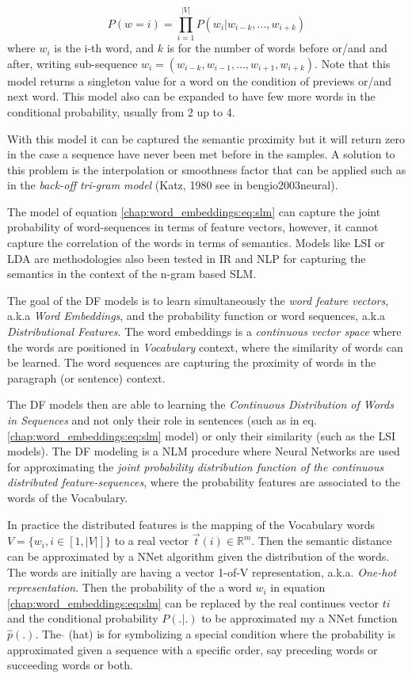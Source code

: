 \begin{equation} \label{chap:word_embeddings:eq:slm}
	P(w = i) = \prod_{i=1}^{|V|} P(w_{i}|w_{i-k}, ... , w_{i+k})
\end{equation}
\noindent
where $w_{i}$ is the i-th word, and $k$ is for the number of words before or/and and after, writing sub-sequence $w_{i} = (w_{i-k}, w_{i-1}, ... ,w_{i+1}, w_{i+k})$. Note that this model returns a singleton value for a word on the condition of previews or/and next word. This model also can be expanded to have few more words in the conditional probability, usually from 2 up to 4. 

With this model it can be captured the semantic proximity but it will return zero in the case a sequence have never been met before in the samples. A solution to this problem is the interpolation or smoothness factor that can be applied such as in the \textit{back-off tri-gram model} (Katz, 1980 see in bengio2003neural). 

The model of equation \ref{chap:word_embeddings:eq:slm} can capture the joint probability of word-sequences in terms of feature vectors, however, it cannot capture the correlation of the words in terms of semantics. Models like LSI or LDA are methodologies also been tested in IR and NLP for capturing the semantics in the context of the n-gram based SLM. 

The goal of the DF models is to learn simultaneously the \textit{word feature vectors}, a.k.a \textit{Word Embeddings}, and the probability function or word sequences, a.k.a \textit{Distributional Features}. The word embeddings is a \textit{continuous vector space} where the words are positioned in \textit{Vocabulary} context, where the similarity of words can be learned. The word sequences are capturing the proximity of words in the paragraph (or sentence) context.

The DF models then are able to learning the \textit{Continuous Distribution of Words in Sequences} and not only their role in sentences (such as in eq.  \ref{chap:word_embeddings:eq:slm} model) or only their similarity (such as the LSI models). The DF modeling is a NLM procedure where Neural Networks are used for approximating the\textit{ joint probability distribution function of the continuous distributed feature-sequences}, where the probability features are associated to the words of the Vocabulary.

In practice the distributed features is the mapping of the Vocabulary words $V = \{w_{i}, i \in [1, |V|] \}$ to a real vector $\vec{t}(i) \in \mathbb{R}^{m}$. Then the semantic distance can be approximated by a NNet algorithm given the distribution of the words. The words are initially are having a vector 1-of-V representation, a.k.a. \textit{One-hot representation}. Then the probability of the a word $w_{i}$ in equation \ref{chap:word_embeddings:eq:slm} can be replaced by the real continues vector $t{i}$ and the conditional probability $P(.|.)$ to be approximated my a NNet function $\hat{p}(.)$. The $\hat{}$ (hat) is for symbolizing a special condition where the probability is approximated given a sequence with a specific order, say preceding words or succeeding words or both. 

